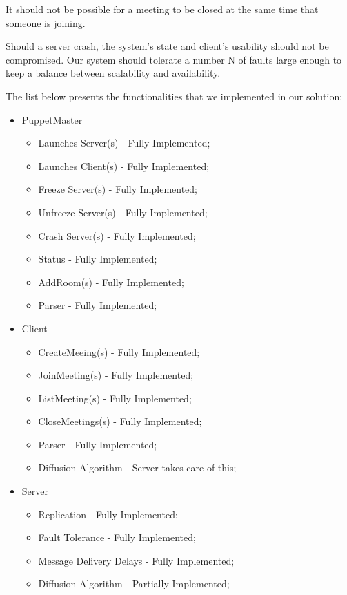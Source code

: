 \documentclass[times, 10pt, twocolumn]{article}
\begin{document}
It should not be possible for a meeting to be closed at the same time that someone is joining.

Should a server crash, the system’s state and client’s usability should not be compromised. Our system should tolerate a number N of faults large enough to keep a balance between scalability and availability.


The list below presents the functionalities that we implemented in our solution:

\begin{itemize}
   \item PuppetMaster
   \begin{itemize}
     \item Launches Server(s) - Fully Implemented;
     \item Launches Client(s) - Fully Implemented;
     \item Freeze Server(s) - Fully Implemented;
     \item Unfreeze Server(s) - Fully Implemented;
     \item Crash Server(s) - Fully Implemented;
     \item Status - Fully Implemented;
     \item AddRoom(s) - Fully Implemented;
     \item Parser - Fully Implemented;
   \end{itemize}
   \item Client
   \begin{itemize}
     \item CreateMeeing(s) - Fully Implemented;
     \item JoinMeeting(s) - Fully Implemented;
     \item ListMeeting(s) - Fully Implemented;
     \item CloseMeetings(s) - Fully Implemented;
     \item Parser - Fully Implemented;
     \item Diffusion Algorithm - Server takes care of this;
   \end{itemize}
   \item Server
   \begin{itemize}
     \item Replication - Fully Implemented;
     \item Fault Tolerance - Fully Implemented;
     \item Message Delivery Delays - Fully Implemented;
     \item Diffusion Algorithm - Partially Implemented;
   \end{itemize}
\end{itemize}
\end{document}
